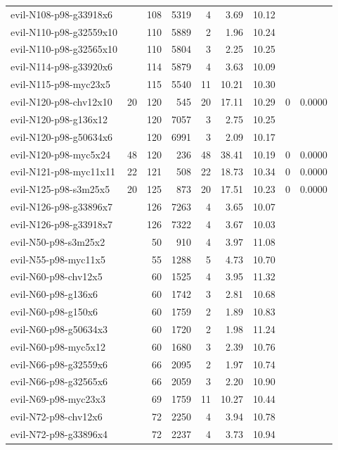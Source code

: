 \begin{longtable}{llrrrrrll}
evil-N108-p98-g33918x6 &  & 108 & 5319 & 4 & 3.69 & 10.12 &  &  \\
evil-N110-p98-g32559x10 &  & 110 & 5889 & 2 & 1.96 & 10.24 &  &  \\
evil-N110-p98-g32565x10 &  & 110 & 5804 & 3 & 2.25 & 10.25 &  &  \\
evil-N114-p98-g33920x6 &  & 114 & 5879 & 4 & 3.63 & 10.09 &  &  \\
evil-N115-p98-myc23x5 &  & 115 & 5540 & 11 & 10.21 & 10.30 &  &  \\
evil-N120-p98-chv12x10 & 20 & 120 & 545 & 20 & 17.11 & 10.29 & 0 & 0.0000 \\
evil-N120-p98-g136x12 &  & 120 & 7057 & 3 & 2.75 & 10.25 &  &  \\
evil-N120-p98-g50634x6 &  & 120 & 6991 & 3 & 2.09 & 10.17 &  &  \\
evil-N120-p98-myc5x24 & 48 & 120 & 236 & 48 & 38.41 & 10.19 & 0 & 0.0000 \\
evil-N121-p98-myc11x11 & 22 & 121 & 508 & 22 & 18.73 & 10.34 & 0 & 0.0000 \\
evil-N125-p98-s3m25x5 & 20 & 125 & 873 & 20 & 17.51 & 10.23 & 0 & 0.0000 \\
evil-N126-p98-g33896x7 &  & 126 & 7263 & 4 & 3.65 & 10.07 &  &  \\
evil-N126-p98-g33918x7 &  & 126 & 7322 & 4 & 3.67 & 10.03 &  &  \\
evil-N50-p98-s3m25x2 &  & 50 & 910 & 4 & 3.97 & 11.08 &  &  \\
evil-N55-p98-myc11x5 &  & 55 & 1288 & 5 & 4.73 & 10.70 &  &  \\
evil-N60-p98-chv12x5 &  & 60 & 1525 & 4 & 3.95 & 11.32 &  &  \\
evil-N60-p98-g136x6 &  & 60 & 1742 & 3 & 2.81 & 10.68 &  &  \\
evil-N60-p98-g150x6 &  & 60 & 1759 & 2 & 1.89 & 10.83 &  &  \\
evil-N60-p98-g50634x3 &  & 60 & 1720 & 2 & 1.98 & 11.24 &  &  \\
evil-N60-p98-myc5x12 &  & 60 & 1680 & 3 & 2.39 & 10.76 &  &  \\
evil-N66-p98-g32559x6 &  & 66 & 2095 & 2 & 1.97 & 10.74 &  &  \\
evil-N66-p98-g32565x6 &  & 66 & 2059 & 3 & 2.20 & 10.90 &  &  \\
evil-N69-p98-myc23x3 &  & 69 & 1759 & 11 & 10.27 & 10.44 &  &  \\
evil-N72-p98-chv12x6 &  & 72 & 2250 & 4 & 3.94 & 10.78 &  &  \\
evil-N72-p98-g33896x4 &  & 72 & 2237 & 4 & 3.73 & 10.94 &  &  \\

\end{longtable}

